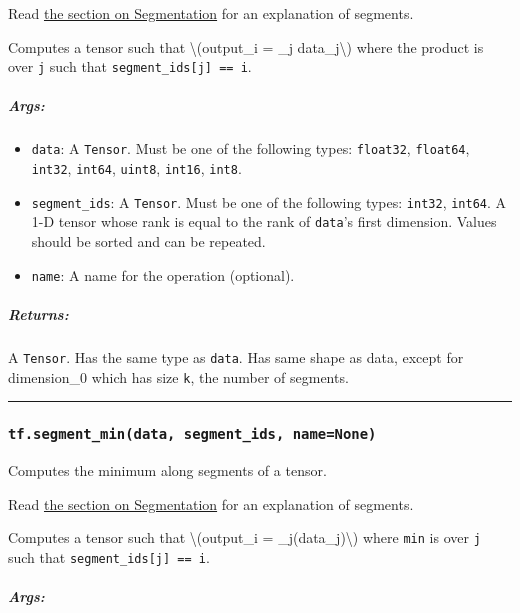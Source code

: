Read \href{../../api_docs/python/math_ops.md\#segmentation}{the section
on Segmentation} for an explanation of segments.

Computes a tensor such that \textbackslash{}(output\_i = \prod\_j
data\_j\textbackslash{}) where the product is over \texttt{j} such that
\texttt{segment\_ids{[}j{]}\ ==\ i}.

\subparagraph{Args: }\label{args-47}

\begin{itemize}
\tightlist
\item
  \texttt{data}: A \texttt{Tensor}. Must be one of the following types:
  \texttt{float32}, \texttt{float64}, \texttt{int32}, \texttt{int64},
  \texttt{uint8}, \texttt{int16}, \texttt{int8}.
\item
  \texttt{segment\_ids}: A \texttt{Tensor}. Must be one of the following
  types: \texttt{int32}, \texttt{int64}. A 1-D tensor whose rank is
  equal to the rank of \texttt{data}'s first dimension. Values should be
  sorted and can be repeated.
\item
  \texttt{name}: A name for the operation (optional).
\end{itemize}

\subparagraph{Returns: }\label{returns-47}

A \texttt{Tensor}. Has the same type as \texttt{data}. Has same shape as
data, except for dimension\_0 which has size \texttt{k}, the number of
segments.

\begin{center}\rule{0.5\linewidth}{\linethickness}\end{center}

\subsubsection{\texorpdfstring{\texttt{tf.segment\_min(data,\ segment\_ids,\ name=None)}
}{tf.segment\_min(data, segment\_ids, name=None) }}\label{tf.segmentux5fmindata-segmentux5fids-namenone}

Computes the minimum along segments of a tensor.

Read \href{../../api_docs/python/math_ops.md\#segmentation}{the section
on Segmentation} for an explanation of segments.

Computes a tensor such that \textbackslash{}(output\_i =
\min\_j(data\_j)\textbackslash{}) where \texttt{min} is over \texttt{j}
such that \texttt{segment\_ids{[}j{]}\ ==\ i}.

\subparagraph{Args: }\label{args-48}


